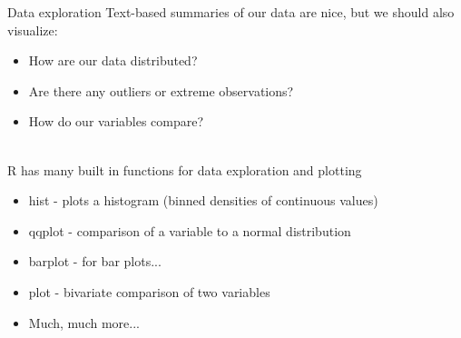 \documentclass[xcolor=svgnames]{beamer}\usepackage[]{graphicx}\usepackage[]{color}
\begin{document}
\begin{frame}[fragile]{Data exploration}
Text-based summaries of our data are nice, but we should also visualize:
\begin{itemize}
\item How are our data distributed?
\item Are there any outliers or extreme observations?
\item How do our variables compare?\\~\\
\end{itemize}
R has many built in functions for data exploration and plotting
\begin{itemize}
\item hist - plots a histogram (binned densities of continuous values)
\item qqplot - comparison of a variable to a normal distribution
\item barplot - for bar plots...
\item plot - bivariate comparison of two variables
\item Much, much more...
\end{itemize}
\end{frame}
\end{document}

